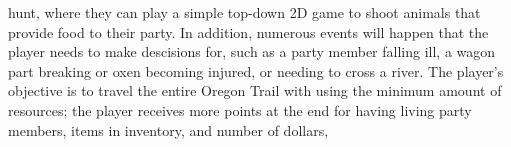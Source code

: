 hunt, where they can play a simple top-down 2D game to shoot animals that provide food to their party. In addition, numerous events will happen that the player needs to make descisions for, such as a party member falling ill, a wagon part breaking or oxen becoming injured, or needing to cross a river. The player's objective is to travel the entire Oregon Trail with using the minimum amount of resources; the player receives more points at the end for having living party members, items in inventory, and number of dollars, 